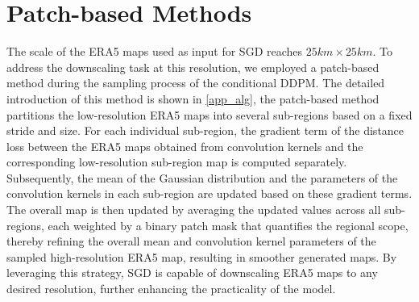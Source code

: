 \section{Patch-based Methods}
The scale of the ERA5 maps used as input for SGD reaches $25km\times 25km$. 
To address the downscaling task at this resolution, we employed a patch-based method during the sampling process of the conditional DDPM. 
The detailed introduction of this method is shown in \cref{app_alg}, the patch-based method partitions the low-resolution ERA5 maps into several sub-regions based on a fixed stride and size. 
For each individual sub-region, the gradient term of the distance loss between the ERA5 maps obtained from convolution kernels and the corresponding low-resolution sub-region map is computed separately. 
Subsequently, the mean of the Gaussian distribution and the parameters of the convolution kernels in each sub-region are updated based on these gradient terms. 
The overall map is then updated by averaging the updated values across all sub-regions, each weighted by a binary patch mask that quantifies the regional scope, thereby refining the overall mean and convolution kernel parameters of the sampled high-resolution ERA5 map, resulting in smoother generated maps. 
By leveraging this strategy, SGD is capable of downscaling ERA5 maps to any desired resolution, further enhancing the practicality of the model. 

